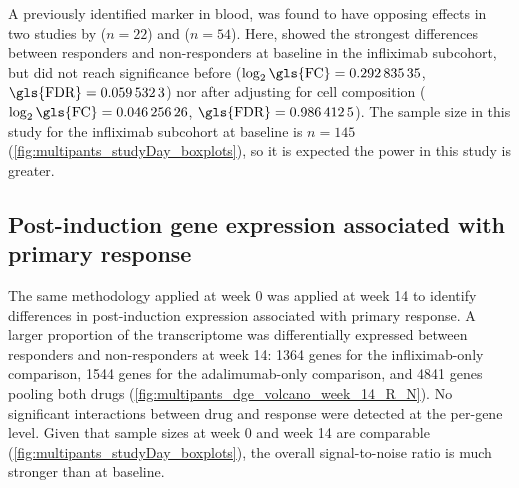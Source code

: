 A previously identified marker in blood,  was found to have opposing effects in two studies by \textcite{gaujoux2019CellcentredMetaanalysisReveals} ($n=22$) and \textcite{verstockt2019LowTREM1Expression} ($n=54$).
Here,  showed the strongest differences between responders and non-responders at baseline in the infliximab subcohort, 
but did not reach significance before ($\log_2\text{\gls{FC}} = \num{0.29283535}$, $\text{\gls{FDR}}=\num{0.0595323}$)
nor after adjusting for cell composition ($\log_2\text{\gls{FC}} = \num{0.04625626}$, $\text{\gls{FDR}}=\num{0.9864125}$).
The sample size in this study for the infliximab subcohort at baseline is $n=145$ (\cref{fig:multipants_studyDay_boxplots}), so it is expected the power in this study is greater.



\subsection{Post-induction gene expression associated with primary response}

The same methodology applied at week 0 was applied at week 14 to identify differences in post-induction expression associated with primary response.
A larger proportion of the transcriptome was differentially expressed between responders and non-responders at week 14: 
1364 genes for the infliximab-only comparison, 
1544 genes for the adalimumab-only comparison, 
and 4841 genes pooling both drugs (\cref{fig:multipants_dge_volcano_week_14_R_N}).
No significant interactions between drug and response were detected at the per-gene level.
Given that sample sizes at week 0 and week 14 are comparable (\cref{fig:multipants_studyDay_boxplots}), the overall signal-to-noise ratio is much stronger than at baseline.

